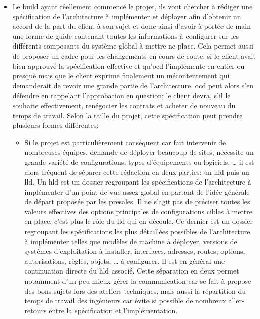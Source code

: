 \documentclass[12pt, oneside, a4paper, titlepage]{report}
\begin{document}
\begin{itemize}
    \item Le \gls{build} ayant réellement commencé le projet, ils vont chercher
        à rédiger une spécification de l'architecture à implémenter et déployer
        afin d'obtenir un accord de la part du client à son sujet et donc ainsi
        d'avoir à portée de main une forme de guide contenant toutes les
        informations à configurer sur les différents composants du système
        global à mettre ne place. Cela permet aussi de proposer un cadre pour
        les changements en cours de route: si le client avait bien approuvé la
        spécification effective et qu'\acrlong{ocd} l'implémente en entier ou
        presque mais que le client exprime finalement un mécontentement qui
        demanderait de revoir une grande partie de l'architecture, \gls{ocd}
        peut alors s'en défendre en rappelant l'approbation en question; le
        client devra, s'il le souhaite effectivement, renégocier les contrats et
        acheter de nouveau du temps de travail. Selon la taille du projet, cette
        spécification peut prendre plusieurs formes différentes:

    \begin{itemize}

        \item Si le projet est particulièrement conséquent car fait intervenir
            de nombreuses équipes, demande de déployer beaucoup de sites,
            nécessite un grande variété de configurations, types d'équipements
            ou logiciels, \ldots{} il est alors fréquent de séparer cette
            rédaction en deux parties: un \gls{hld} puis un \gls{lld}. Un
            \gls{hld} est un dossier regroupant les spécifications de
            l'architecture à implémenter d'un point de vue assez global en
            partant de l'idée générale de départ proposée par les
            \gls{presales}. Il ne s'agit pas de préciser toutes les valeurs
            effectives des options principales de configurations cibles à mettre
            en place: c'est plus le rôle du \gls{lld} qui en découle. Ce dernier
            est un dossier regroupant les spécifications les plus détaillées
            possibles de l'architecture à implémenter telles que modèles de
            machine à déployer, versions de systèmes d'exploitation à installer,
            interfaces, adresses, routes, options, autorisations, règles,
            objets, \ldots{} à configurer. Il est en général une continuation
            directe du \gls{hld} associé. Cette séparation en deux permet
            notamment d'un peu mieux gérer la communication car se fait à
            propose des bons sujets lors des ateliers techniques, mais aussi la
            répartition du temps de travail des ingénieurs car évite si possible
            de nombreux aller-retours entre la spécification et
            l'implémentation.


\end{itemize}
\end{itemize}
\end{document}

